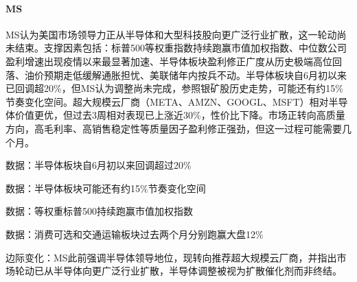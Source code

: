 \documentclass[11pt]{ctexart}
\begin{document}
\paragraph{MS} MS认为美国市场领导力正从半导体和大型科技股向更广泛行业扩散，这一轮动尚未结束。支撑因素包括：标普500等权重指数持续跑赢市值加权指数、中位数公司盈利增速出现疫情以来最显著加速、半导体板块盈利修正广度从历史极端高位回落、油价预期走低缓解通胀担忧、美联储年内按兵不动。半导体板块自6月初以来已回调超20\%，但MS认为调整尚未完成，参照银矿股历史走势，可能还有约15\%节奏变化空间。超大规模云厂商（META、AMZN、GOOGL、MSFT）相对半导体价值更优，但过去3周相对表现已上涨近30\%，性价比下降。市场正转向高质量方向，高毛利率、高销售稳定性等质量因子盈利修正强劲，但这一过程可能需要几个月。
{\small\color{refgray}数据：半导体板块自6月初以来回调超过20\%\par}
{\small\color{refgray}数据：半导体板块可能还有约15\%节奏变化空间\par}
{\small\color{refgray}数据：等权重标普500持续跑赢市值加权指数\par}
{\small\color{refgray}数据：消费可选和交通运输板块过去两个月分别跑赢大盘12\%\par}
{\small\color{refgray}边际变化：MS此前强调半导体领导地位，现转向推荐超大规模云厂商，并指出市场轮动已从半导体向更广泛行业扩散，半导体调整被视为扩散催化剂而非终结。\par}
\end{document}
